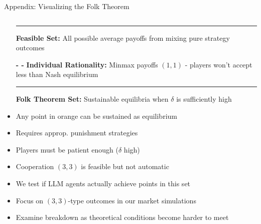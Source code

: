\documentclass[10pt, aspectratio=169]{beamer}
\begin{document}
\begin{frame}{Appendix: Visualizing the Folk Theorem}
\begin{columns}[T]
    \begin{column}{0.45\textwidth}
        \small
        \begin{itemize}
                \item[\textcolor{gray!60}{\rule{0.3cm}{0.3cm}}] \textbf{Feasible Set:} All possible average payoffs from mixing pure strategy outcomes
                \item[\textbf{- -}] \textbf{Individual Rationality:} Minmax payoffs $(1,1)$ - players won't accept less than Nash equilibrium
                \item[\textcolor{orange}{\rule{0.3cm}{0.3cm}}] \textbf{Folk Theorem Set:} Sustainable equilibria when $\delta$ is sufficiently high
                \item Any point in orange can be sustained as equilibrium
                \item Requires approp. punishment strategies
                \item Players must be patient enough ($\delta$ high)
                \item Cooperation $(3,3)$ is feasible but not automatic
                \item We test if LLM agents actually achieve points in this set
                \item Focus on $(3,3)$-type outcomes in our market simulations
                \item Examine breakdown as theoretical conditions become harder to meet
        \end{itemize}
    \end{column}
    \end{columns}
\end{frame}

\end{document}
